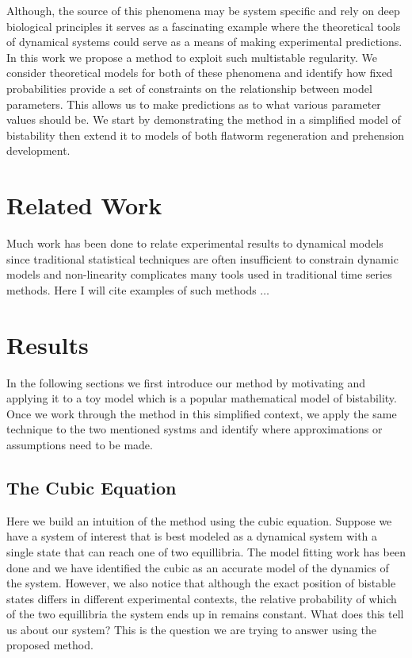 \documentclass[letterpaper]{article}
\begin{document}
Although, the source of this phenomena may be system specific and rely on deep
biological principles it serves as a fascinating example where the theoretical 
tools of dynamical systems could serve as a means of making experimental predictions.
In this work we propose a method to exploit such multistable regularity. We consider
theoretical models for both of these phenomena and identify how fixed 
probabilities provide a set of constraints on the relationship between model
parameters. This allows us to make predictions as to what various parameter 
values should be. We start by demonstrating the method in a simplified model
of bistability  then extend it to models of both flatworm regeneration and
prehension development.
\section{Related Work}
Much work has been done to relate experimental results to dynamical
models since traditional statistical techniques are often insufficient 
to constrain dynamic models and non-linearity complicates many tools used 
in traditional time series methods. Here I will cite examples of such
methods $\ldots$
\section{Results}
In the following sections we first introduce our method by motivating
and applying it to a toy model which is a popular mathematical model
of bistability. Once we work through the method in this simplified 
context, we apply the same technique to the two mentioned systms and 
identify where approximations or assumptions need to be made.
\subsection{The Cubic Equation}
Here we build an intuition of the method using the cubic equation. Suppose
we have a system of interest that is best modeled as a dynamical system
with a single state that can reach one of two equillibria. The model
fitting work has been done and we have identified the cubic as an 
accurate model of the dynamics of the system. However, we also notice
that although the exact position of bistable states differs in different
experimental contexts, the relative probability of which of the two
equillibria the system ends up in remains constant. What does this 
tell us about our system?
This is the question we are trying to answer using the proposed method.\\
\end{document}
